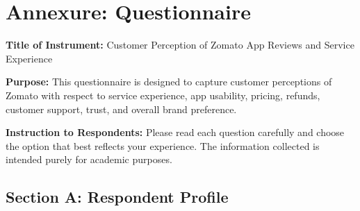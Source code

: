 \chapter*{Annexure: Questionnaire}

\textbf{Title of Instrument:} Customer Perception of Zomato App Reviews and Service Experience

\textbf{Purpose:} This questionnaire is designed to capture customer perceptions of Zomato with respect to service experience, app usability, pricing, refunds, customer support, trust, and overall brand preference.

\textbf{Instruction to Respondents:} Please read each question carefully and choose the option that best reflects your experience. The information collected is intended purely for academic purposes.

\vspace{0.5cm}

\section*{Section A: Respondent Profile}

